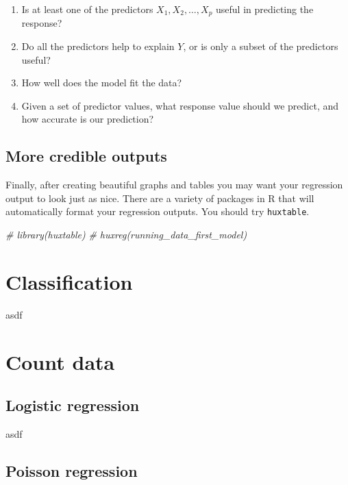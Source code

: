 \documentclass[
]{book}
\newenvironment{Shaded}{\begin{snugshade}}{\end{snugshade}}
\newcommand{\CommentTok}[1]{\textcolor[rgb]{0.56,0.35,0.01}{\textit{#1}}}
\providecommand{\tightlist}{%
  \setlength{\itemsep}{0pt}\setlength{\parskip}{0pt}}
\begin{document}
\begin{enumerate}
\def\labelenumi{\arabic{enumi}.}
\tightlist
\item
  Is at least one of the predictors \(X_1, X_2, \dots, X_p\) useful in predicting the response?
\item
  Do all the predictors help to explain \(Y\), or is only a subset of the predictors useful?
\item
  How well does the model fit the data?
\item
  Given a set of predictor values, what response value should we predict, and how accurate is our prediction?
\end{enumerate}

\hypertarget{more-credible-outputs}{%
\subsection{More credible outputs}\label{more-credible-outputs}}

Finally, after creating beautiful graphs and tables you may want your regression output to look just as nice. There are a variety of packages in R that will automatically format your regression outputs. You should try \texttt{huxtable}.

\begin{Shaded}
\begin{Highlighting}[]
\CommentTok{# library(huxtable)}
\CommentTok{# huxreg(running_data_first_model)}
\end{Highlighting}
\end{Shaded}

\hypertarget{classification}{%
\section{Classification}\label{classification}}

asdf

\hypertarget{count-data}{%
\section{Count data}\label{count-data}}

\hypertarget{logistic-regression-2}{%
\subsection{Logistic regression}\label{logistic-regression-2}}

asdf

\hypertarget{poisson-regression}{%
\subsection{Poisson regression}\label{poisson-regression}}
\end{document}
